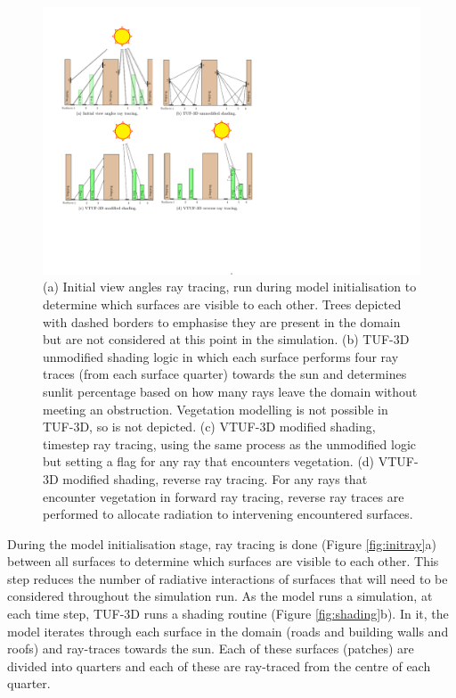 \documentclass[final,3p,times,authoryear]{elsarticle}
\begin{document}
\begin{figure}[!htbp]
\includegraphics[trim = 15mm 50mm 132mm 15mm, clip, scale=0.75]{images/ModelDiagramsCombined2.pdf}
   \caption{(a) Initial view angles ray tracing, run during model initialisation to determine which surfaces are visible to each other. Trees depicted with dashed borders to emphasise they are present in the domain but are not considered at this point in the simulation. \label{fig:initray} (b) TUF-3D unmodified shading logic in which each surface performs four ray traces (from each surface quarter) towards the sun and determines sunlit percentage based on how many rays leave the domain without meeting an obstruction. Vegetation modelling is not possible in TUF-3D, so is not depicted. \label{fig:shading} (c) VTUF-3D modified shading, timestep ray tracing, using the same process as the unmodified logic but setting a flag for any ray that encounters vegetation. \label{fig:modshading} (d) VTUF-3D modified shading, reverse ray tracing. For any rays that encounter vegetation in forward ray tracing, reverse ray traces are performed to allocate radiation to intervening encountered surfaces. \label{fig:modshadingreverse}} 
\end{figure}


During the model initialisation stage, ray tracing is done (Figure \ref{fig:initray}a) between all surfaces to determine which surfaces are visible to each other. This step reduces the number of radiative interactions of surfaces that will need to be considered throughout the simulation run. As the model runs a simulation, at each time step, TUF-3D runs a shading routine (Figure \ref{fig:shading}b). In it, the model iterates through each surface in the domain (roads and building walls and roofs) and ray-traces towards the sun. Each of these surfaces (patches) are divided into quarters and each of these are ray-traced from the centre of each quarter. 
\end{document}
